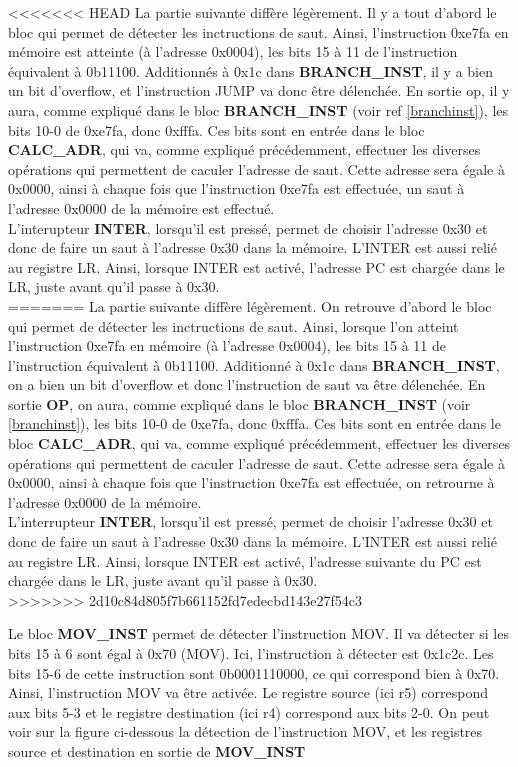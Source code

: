 \documentclass[a4paper]{article} %
\begin{document}
<<<<<<< HEAD
La partie suivante diffère légèrement. Il y a tout d'abord le bloc  qui permet de détecter les inctructions de saut. Ainsi, l'instruction 0xe7fa en mémoire est atteinte (à l'adresse 0x0004), les bits 15 à 11 de l'instruction équivalent à 0b11100. Additionnés à 0x1c dans \textbf{BRANCH\_INST}, il y a bien un bit d'overflow, et l'instruction JUMP va donc être délenchée. En sortie op, il y aura, comme expliqué dans le bloc \textbf{BRANCH\_INST} (voir ref \ref{branchinst}), les bits 10-0 de 0xe7fa, donc 0xfffa. Ces bits sont en entrée dans le bloc \textbf{CALC\_ADR}, qui va, comme expliqué précédemment, effectuer les diverses opérations qui permettent de caculer l'adresse de saut. Cette adresse sera égale à 0x0000, ainsi à chaque fois que l'instruction 0xe7fa est effectuée, un saut à l'adresse 0x0000 de la mémoire est effectué.\\
L'interupteur \textbf{INTER}, lorsqu'il est pressé, permet de choisir l'adresse 0x30 et donc de faire un saut à l'adresse 0x30 dans la mémoire. L'INTER est aussi relié au registre LR. Ainsi, lorsque INTER est activé, l'adresse PC est chargée dans le LR, juste avant qu'il passe à 0x30.\medskip \\
=======
La partie suivante diffère légèrement. On retrouve d'abord le bloc  qui permet de détecter les inctructions de saut. Ainsi, lorsque l'on atteint l'instruction 0xe7fa en mémoire (à l'adresse 0x0004), les bits 15 à 11 de l'instruction équivalent à 0b11100. Additionné à 0x1c dans \textbf{BRANCH\_INST}, on a bien un bit d'overflow et donc l'instruction de saut va être délenchée. En sortie \textbf{OP}, on aura, comme expliqué dans le bloc \textbf{BRANCH\_INST} (voir \ref{branchinst}), les bits 10-0 de 0xe7fa, donc 0xfffa. Ces bits sont en entrée dans le bloc \textbf{CALC\_ADR}, qui va, comme expliqué précédemment, effectuer les diverses opérations qui permettent de caculer l'adresse de saut. Cette adresse sera égale à 0x0000, ainsi à chaque fois que l'instruction 0xe7fa est effectuée, on retrourne à l'adresse 0x0000 de la mémoire.\\
L'interrupteur \textbf{INTER}, lorsqu'il est pressé, permet de choisir l'adresse 0x30 et donc de faire un saut à l'adresse 0x30 dans la mémoire. L'INTER est aussi relié au registre LR. Ainsi, lorsque INTER est activé, l'adresse suivante du PC est chargée dans le LR, juste avant qu'il passe à 0x30.\medskip \\
>>>>>>> 2d10c84d805f7b661152fd7edecbd143e27f54c3

Le bloc \textbf{MOV\_INST} permet de détecter l'instruction MOV. Il va détecter si les bits 15 à 6 sont égal à 0x70 (MOV). Ici, l'instruction à détecter est 0x1c2c. Les bits 15-6 de cette instruction sont 0b0001110000, ce qui correspond bien à 0x70. 
\\Ainsi, l'instruction MOV va être activée. Le registre source (ici r5) correspond aux bits 5-3 et le registre destination (ici r4) correspond aux bits 2-0. On peut voir sur la figure ci-dessous la détection de l'instruction MOV, et les registres source et destination en sortie de \textbf{MOV\_INST}
\end{document}

